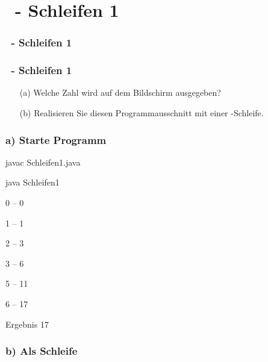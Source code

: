 \def\stitle{\theexercise\ - Schleifen 1}
\section{\stitle}
\begin{frame}
    \frametitle{\stitle}
\tableofcontents[current]    
\end{frame}

\begin{frame}[t]%
    \frametitle{\stitle}


\begin{itemize}
\item[(a)] Welche Zahl wird auf dem Bildschirm ausgegeben?
\item[(b)] Realisieren Sie diesen Programmausschnitt mit einer -Schleife.
\end{itemize}

\end{frame}


\begin{frame}[fragile]%
 \frametitle{a) Starte Programm}%

\begin{description}[style=BASH]
\item[Konsole]
\item javac Schleifen1.java
\item java Schleifen1
\item 0  --  0
\item 1  --  1
\item 2  --  3
\item 3  --  6
\item 5  --  11
\item 6  --  17
\item Ergebnis 17
\end{description}

\end{frame}


\begin{frame}[fragile]%
 \frametitle{b) Als  Schleife}%


\end{frame}
